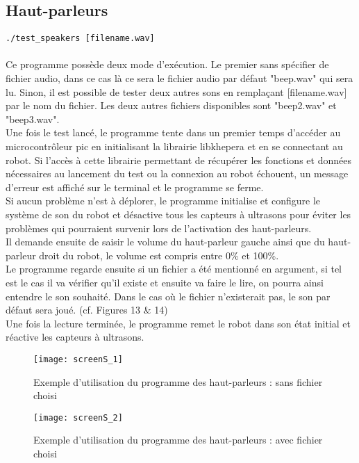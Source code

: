\documentclass[11pt]{article} %
\begin{document}
\subsection{Haut-parleurs}
\verb|./test_speakers [filename.wav]|\\
 \\
Ce programme possède deux mode d’exécution. Le premier sans spécifier de fichier audio, dans ce cas là ce sera le fichier audio par défaut "beep.wav" qui sera lu. Sinon, il est possible de tester deux autres sons en remplaçant [filename.wav] par le nom du fichier. Les deux autres fichiers disponibles sont "beep2.wav" et "beep3.wav".\\
Une fois le test lancé, le programme tente dans un premier temps d’accéder au microcontrôleur pic en initialisant la librairie libkhepera et en se connectant au robot. Si l’accès à cette librairie permettant de récupérer les fonctions et données nécessaires au lancement du test ou la connexion au robot échouent, un message d’erreur est affiché sur le terminal et le programme se ferme.\\
Si aucun problème n’est à déplorer, le programme initialise et configure le système de son du robot et désactive tous les capteurs à ultrasons pour éviter les problèmes qui pourraient survenir lors de l’activation des haut-parleurs.\\
Il demande ensuite de saisir le volume du haut-parleur gauche ainsi que du haut-parleur droit du robot, le volume est compris entre 0\% et 100\%.\\
Le programme regarde ensuite si un fichier a été mentionné en argument, si tel est le cas il va vérifier qu’il existe et ensuite va faire le lire, on pourra ainsi entendre le son souhaité. Dans le cas où le fichier n’existerait pas, le son par défaut sera joué. (cf. Figures 13 \& 14)\\
Une fois la lecture terminée, le programme remet le robot dans son état initial et réactive les capteurs à ultrasons.\\
\begin{figure}[H]
	\caption{Exemple d'utilisation du programme des haut-parleurs : sans fichier choisi}
	\texttt{[image: screenS\_1]}
\end{figure}
\begin{figure}[H]
\caption{Exemple d'utilisation du programme des haut-parleurs : avec fichier choisi}
\texttt{[image: screenS\_2]}
\end{figure}
\end{document}
